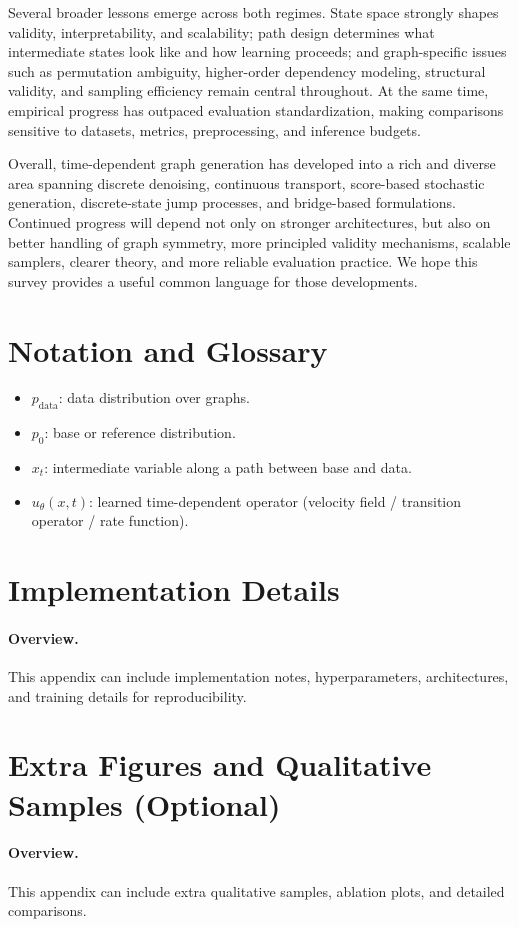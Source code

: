 \documentclass{article}
\begin{document}
Several broader lessons emerge across both regimes. State space strongly shapes validity, interpretability, and scalability; path design determines what intermediate states look like and how learning proceeds; and graph-specific issues such as permutation ambiguity, higher-order dependency modeling, structural validity, and sampling efficiency remain central throughout. At the same time, empirical progress has outpaced evaluation standardization, making comparisons sensitive to datasets, metrics, preprocessing, and inference budgets.

Overall, time-dependent graph generation has developed into a rich and diverse area spanning discrete denoising, continuous transport, score-based stochastic generation, discrete-state jump processes, and bridge-based formulations. Continued progress will depend not only on stronger architectures, but also on better handling of graph symmetry, more principled validity mechanisms, scalable samplers, clearer theory, and more reliable evaluation practice. We hope this survey provides a useful common language for those developments.






\section{Notation and Glossary}
\label{sec:appendix_notation}

\begin{itemize}[leftmargin=*]
  \item $p_{\mathrm{data}}$: data distribution over graphs.
  \item $p_0$: base or reference distribution.
  \item $x_t$: intermediate variable along a path between base and data.
  \item $u_\theta(x,t)$: learned time-dependent operator (velocity field / transition operator / rate function).
\end{itemize}

\section{Implementation Details}
\label{sec:appendix_impl}

\paragraph{Overview.}
This appendix can include implementation notes, hyperparameters, architectures, and training details for reproducibility.

\section{Extra Figures and Qualitative Samples (Optional)}
\label{sec:appendix_figs}

\paragraph{Overview.}
This appendix can include extra qualitative samples, ablation plots, and detailed comparisons.
\end{document}
